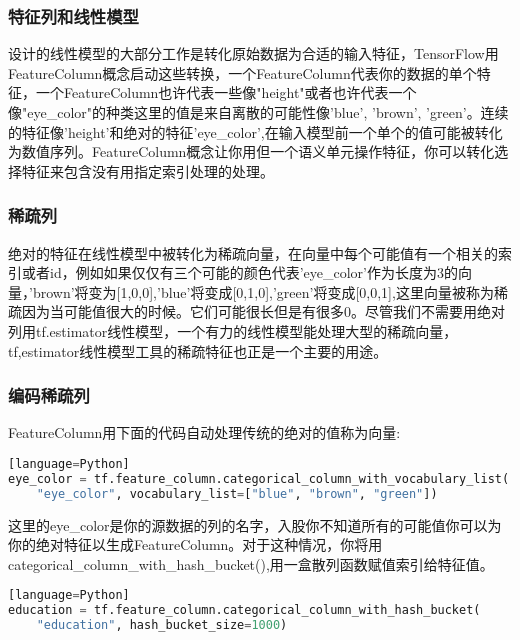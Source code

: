\subsubsection{特征列和线性模型}
设计的线性模型的大部分工作是转化原始数据为合适的输入特征，TensorFlow用FeatureColumn概念启动这些转换，一个FeatureColumn代表你的数据的单个特征，一个FeatureColumn也许代表一些像"height"或者也许代表一个像"eye\_color"的种类这里的值是来自离散的可能性像{'blue', 'brown', 'green'}。连续的特征像'height'和绝对的特征'eye\_color',在输入模型前一个单个的值可能被转化为数值序列。FeatureColumn概念让你用但一个语义单元操作特征，你可以转化选择特征来包含没有用指定索引处理的处理。
\subsubsection{稀疏列}
绝对的特征在线性模型中被转化为稀疏向量，在向量中每个可能值有一个相关的索引或者id，例如如果仅仅有三个可能的颜色代表'eye\_color'作为长度为3的向量，'brown'将变为[1,0,0],'blue'将变成[0,1,0],'green'将变成[0,0,1],这里向量被称为稀疏因为当可能值很大的时候。它们可能很长但是有很多0。尽管我们不需要用绝对列用tf.estimator线性模型，一个有力的线性模型能处理大型的稀疏向量，tf,estimator线性模型工具的稀疏特征也正是一个主要的用途。
\subsubsection{编码稀疏列}
FeatureColumn用下面的代码自动处理传统的绝对的值称为向量:
\begin{lstlisting}[language=Python][language=Python]
eye_color = tf.feature_column.categorical_column_with_vocabulary_list(
    "eye_color", vocabulary_list=["blue", "brown", "green"])
\end{lstlisting}
这里的eye\_color是你的源数据的列的名字，入股你不知道所有的可能值你可以为你的绝对特征以生成FeatureColumn。对于这种情况，你将用categorical\_column\_with\_hash\_bucket(),用一盒散列函数赋值索引给特征值。
\begin{lstlisting}[language=Python][language=Python]
education = tf.feature_column.categorical_column_with_hash_bucket(
    "education", hash_bucket_size=1000)
\end{lstlisting}
